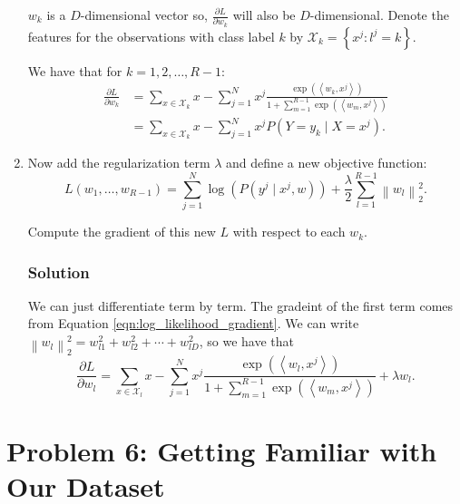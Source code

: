 \documentclass[letterpaper,11pt]{article}
\begin{document}
\begin{enumerate}
  $w_k$ is a $D$-dimensional vector so, $\frac{\partial L}{\partial w_k}$ will
  also be $D$-dimensional. Denote the features for the observations with class
  label $k$ by $\mathcal{X}_k = \left\{x^j : l^j = k\right\}$.

  We have that for $k = 1,2,\ldots,R-1$:
  \begin{align}
    \frac{\partial L}{\partial w_k}
    &= \sum_{x \in \mathcal{X}_k} x
      - \sum_{j=1}^Nx^j\frac{
      \exp\left(\left\langle w_k,x^j\right\rangle\right)
      }
      {1 + \sum_{m=1}^{R - 1}\exp\left(\left\langle w_m,x^j\right\rangle\right)}
      \label{eqn:log_likelihood_gradient}\\   
    &= \sum_{x \in \mathcal{X}_k} x -
      \sum_{j=1}^N x^j P\left(Y = y_k \mid X = x^j\right).
      \nonumber
  \end{align}
\item Now add the regularization term $\lambda$ and define a new objective
  function:
  \begin{equation}
    L\left(w_1,\ldots,w_{R-1}\right) = \sum_{j=1}^N\log\left(
      P\left(y^j \mid x^j, w\right)
    \right)
    +
    \frac{\lambda}{2}\sum_{l=1}^{R-1}\left\lVert w_l\right\rVert_2^2.
    \label{eqn:log_likelihood_with_penalty}
  \end{equation}

  Compute the gradient of this new $L$ with respect to each $w_k$.

  \subsubsection*{Solution}

  We can just differentiate term by term. The gradeint of the first term comes
  from Equation \ref{eqn:log_likelihood_gradient}. We can write
  $\left\lVert w_l\right\rVert_2^2 = w_{l1}^2 + w_{l2}^2 + \cdots + w_{lD}^2$,
  so we have that
  \begin{equation}
    \frac{\partial L}{\partial w_l}
    = \sum_{x \in \mathcal{X}_l} x
      - \sum_{j=1}^Nx^j\frac{
      \exp\left(\left\langle w_l,x^j\right\rangle\right)
      }
      {1 + \sum_{m=1}^{R - 1}\exp\left(\left\langle w_m,x^j\right\rangle\right)}
      + \lambda w_l.
  \end{equation}
\end{enumerate}

\section*{Problem 6: Getting Familiar with Our Dataset}
\end{document}
